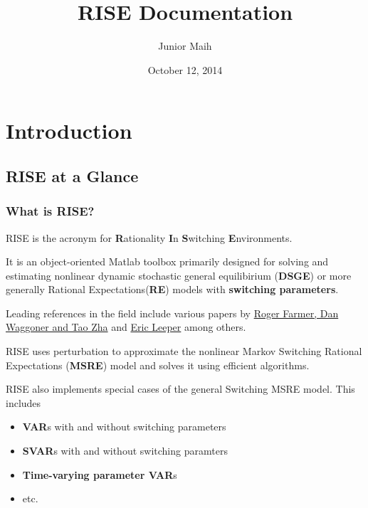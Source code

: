 \documentclass[letterpaper,10pt,english]{sphinxmanual}
\title{RISE Documentation}
\date{October 12, 2014}
\author{Junior Maih}
\begin{document}
\maketitle
\tableofcontents
{}\label{master_doc::doc}



\chapter{Introduction}
\label{introduction:introduction}\label{introduction::doc}\label{introduction:welcome-to-rise-s-documentation}

\section{RISE at a Glance}
\label{intro_folder/rise_at_a_glance::doc}\label{intro_folder/rise_at_a_glance:rise-at-a-glance}

\subsection{What is RISE?}
\label{intro_folder/rise_at_a_glance:what-is-rise}
RISE is the acronym for \textbf{R}ationality \textbf{I}n \textbf{S}witching \textbf{E}nvironments.

It is an object-oriented Matlab toolbox primarily designed for solving and estimating nonlinear
dynamic stochastic general equilibirium (\textbf{DSGE}) or more generally
Rational Expectations(\textbf{RE}) models with \textbf{switching parameters}.

Leading references in the field include various papers by \href{http://www.tzha.net/articles}{Roger Farmer, Dan Waggoner and Tao Zha}
and \href{http://php.indiana.edu/~eleeper/\#Papers}{Eric Leeper} among others.

RISE uses perturbation to approximate the nonlinear Markov Switching Rational
Expectations (\textbf{MSRE}) model and solves it using efficient algorithms.

RISE also implements special cases of the general Switching MSRE model. This includes
\begin{itemize}
\item {} 
\textbf{VAR}s with and without switching parameters

\item {} 
\textbf{SVAR}s with and without switching paramters

\item {} 
\textbf{Time-varying parameter VAR}s

\item {} 
etc.

\end{itemize}
\end{document}
